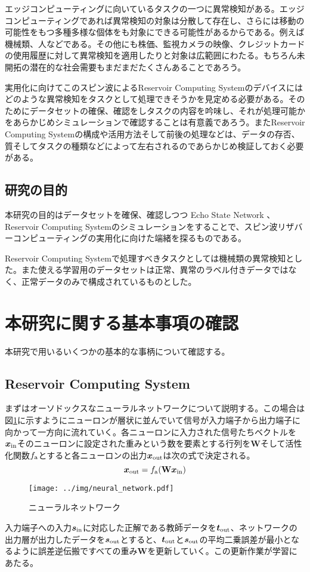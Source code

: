 \documentclass[uplatex,a4paper,10pt]{jsarticle}
\begin{document}
エッジコンピューティングに向いているタスクの一つに異常検知がある。エッジコンピューティングであれば異常検知の対象は分散して存在し、さらには移動の可能性をもつ多種多様な個体をも対象にできる可能性があるからである。例えば機械類、人などである。その他にも株価、監視カメラの映像、クレジットカードの使用履歴に対して異常検知を適用したりと対象は広範囲にわたる。もちろん未開拓の潜在的な社会需要もまだまだたくさんあることであろう。

実用化に向けてこのスピン波によるReservoir Computing Systemのデバイスにはどのような異常検知をタスクとして処理できそうかを見定める必要がある。そのためにデータセットの確保、確認をしタスクの内容を吟味し、それが処理可能かをあらかじめシミュレーションで確認することは有意義であろう。またReservoir Computing Systemの構成や活用方法そして前後の処理などは、データの存否、質そしてタスクの種類などによって左右されるのであらかじめ検証しておく必要がある。

\subsection{研究の目的}
本研究の目的はデータセットを確保、確認しつつ Echo State  Network 、Reservoir Computing Systemのシミュレーションをすることで、スピン波リザバーコンピューティングの実用化に向けた端緒を探るものである。

Reservoir Computing Systemで処理すべきタスクとしては機械類の異常検知とした。また使える学習用のデータセットは正常、異常のラベル付きデータではなく、正常データのみで構成されているものとした。

\section{本研究に関する基本事項の確認}
本研究で用いるいくつかの基本的な事柄について確認する。
\subsection{Reservoir Computing System}
まずはオーソドックスなニューラルネットワークについて説明する。この場合は図\ref{fig:neural_network}に示すようにニューロンが層状に並んでいて信号が入力端子から出力端子に向かって一方向に流れていく。各ニューロンに入力された信号たちベクトルを$\bm{x}_{\rm{in}}$そのニューロンに設定された重みという数を要素とする行列を$\mathbf{W}$そして活性化関数$f_{\rm{a}}$とすると各ニューロンの出力$\bm{x}_{\rm{out}}$は次の式で決定される。
\begin{equation}
    \bm{x}_{\rm{out}} = f_{\rm{a}}(\mathbf{W} \bm{x}_{\rm{in}})
\end{equation}
\begin{figure}[hbtp]
	\centering
	\texttt{[image: ../img/neural\_network.pdf]}
	\caption{ニューラルネットワーク}
	\label{fig:neural_network}
\end{figure}
入力端子への入力$\bm{s}_{\rm{in}}$に対応した正解である教師データを$\bm{t}_{\rm{out}}$、ネットワークの出力層が出力したデータを$\bm{s}_{\rm{out}}$とすると、$\bm{t}_{\rm{out}}$と${\bm{s}_{\rm{out}}}$の平均二乗誤差が最小となるように誤差逆伝搬ですべての重み$\mathbf{W}$を更新していく。この更新作業が学習にあたる。
\end{document}
